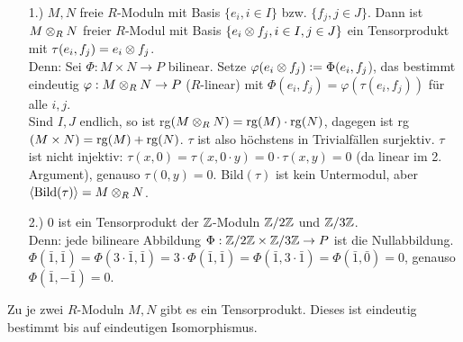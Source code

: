 \documentclass[a4paper, 10pt]{report}
\begin{document}
\begin{nnBsp}
  \begin{enumerate}
    \item[1.)] $M, N$ freie $R$-Moduln mit Basis $\{e_i, i \in I\}$ bzw. $\{f_j, j
               \in J\}$. Dann ist $M \ten[R] N$ freier $R$-Modul mit Basis
               $\{e_i\ten f_j, i \in I, j \in J\}$ ein Tensorprodukt mit
               $\tau(e_i,f_j) = e_i\ten f_j$.\\
               Denn: Sei $\Phi: M \times N \to P$ bilinear. Setze
               $\varphi(e_i \ten f_j) \defeqr \Phi(e_i,f_j$), das bestimmt eindeutig
               $\varphi: M \ten[R] N \to P$ ($R$-linear) mit $\Phi(e_i,f_j) =
               \varphi(\tau(e_i,f_j))$ für alle $i,j$.\\
               Sind $I, J$ endlich, so ist rg$(M \ten[R] N) = \rg(M) \cdot
               \rg(N)$, dagegen ist rg$(M \times N) = \mathrm{rg}(M) +
               \mathrm{rg}(N)$. $\tau$ ist also höchstens in Trivialfällen
               surjektiv. $\tau$ ist nicht injektiv: $\tau(x,0) = \tau(x,0 \cdot
               y) = 0 \cdot \tau(x,y) = 0$ (da linear im 2. Argument), genauso
               $\tau(0,y) = 0$. Bild$(\tau)$ ist kein Untermodul, aber $\langle
               \B{\tau} \rangle = M \ten[R] N$.
    \item[2.)] $0$ ist ein Tensorprodukt der $\mathbb{Z}$-Moduln
               $\mathbb{Z}/2\mathbb{Z}$ und $\mathbb{Z}/3\mathbb{Z}$.\\
               Denn: jede bilineare Abbildung $\Phi: \mathbb{Z}/2\mathbb{Z}
               \times \mathbb{Z}/3\mathbb{Z} \to P$ ist die Nullabbildung.
               $\Phi(\bar{1},\bar{1}) = \Phi(3 \cdot \bar{1},\bar{1}) = 3 \cdot
               \Phi(\bar{1},\bar{1}) = \Phi(\bar{1},3 \cdot \bar{1}) =
               \Phi(\bar{1},\bar{0})= 0$, genauso $\Phi(\bar{1},-\bar{1}) = 0$.
  \end{enumerate}
\end{nnBsp}

\begin{Satz}
  Zu je zwei $R$-Moduln $M,N$ gibt es ein Tensorprodukt. Dieses ist eindeutig
  bestimmt bis auf eindeutigen Isomorphismus.
\end{Satz}
\end{document}
